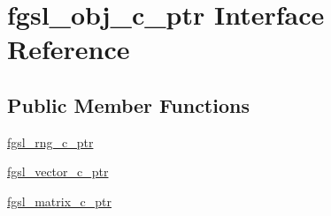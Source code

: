 \hypertarget{interfacefgsl__obj__c__ptr}{\section{fgsl\-\_\-obj\-\_\-c\-\_\-ptr Interface Reference}
\label{interfacefgsl__obj__c__ptr}
}
\subsection*{Public Member Functions}
\begin{DoxyCompactItemize}
\item 
\hyperlink{interfacefgsl__obj__c__ptr_a593cabb6e985652536ae6741b4621a89}{fgsl\-\_\-rng\-\_\-c\-\_\-ptr}
\item 
\hyperlink{interfacefgsl__obj__c__ptr_a72be677e7897297e363013717bbdf85a}{fgsl\-\_\-vector\-\_\-c\-\_\-ptr}
\item 
\hyperlink{interfacefgsl__obj__c__ptr_a9394c0aeb845ae857e326a0ff7ce668a}{fgsl\-\_\-matrix\-\_\-c\-\_\-ptr}
\end{DoxyCompactItemize}


